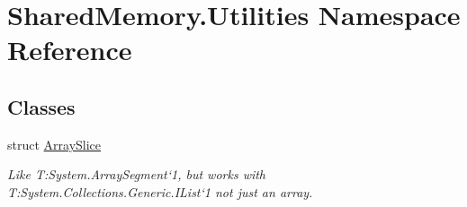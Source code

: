 \hypertarget{namespace_shared_memory_1_1_utilities}{}\section{Shared\+Memory.\+Utilities Namespace Reference}
\label{namespace_shared_memory_1_1_utilities}
\subsection*{Classes}
\begin{DoxyCompactItemize}
\item 
struct \hyperlink{struct_shared_memory_1_1_utilities_1_1_array_slice}{Array\+Slice}
\begin{DoxyCompactList}\small\item\em Like T\+:\+System.\+Array\+Segment`1, but works with T\+:\+System.\+Collections.\+Generic.\+I\+List`1 not just an array. \end{DoxyCompactList}\end{DoxyCompactItemize}
